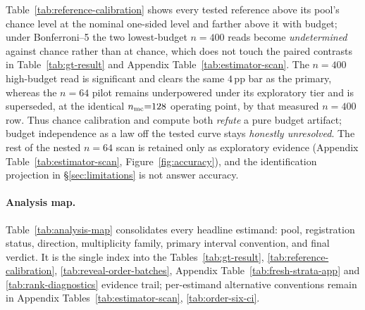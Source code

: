 \documentclass{article}
\newcommand{\pp}{\,\mathrm{pp}}
\begin{document}
Table~\ref{tab:reference-calibration} shows every tested reference above its
pool's chance level at the nominal one-sided level and farther above it with
budget; under Bonferroni--5 the two lowest-budget $n{=}400$ reads become
\emph{undetermined} against chance rather than at chance, which does not touch
the paired contrasts in Table~\ref{tab:gt-result} and Appendix
Table~\ref{tab:estimator-scan}.  The
$n=400$ high-budget read is significant and clears the same $4\pp$ bar as the
primary, whereas the $n=64$ pilot remains underpowered under its exploratory
tier and is superseded, at the identical $n_{\rm mc}{=}128$ operating point, by
that measured $n{=}400$ row.  Thus chance calibration and compute both
\emph{refute} a pure budget artifact; budget independence as a law off the
tested curve stays \emph{honestly unresolved}.  The rest of the nested $n=64$
scan is retained only as exploratory evidence (Appendix
Table~\ref{tab:estimator-scan}, Figure~\ref{fig:accuracy}), and the
identification projection in \S\ref{sec:limitations} is not answer accuracy.

\paragraph{Analysis map.}
Table~\ref{tab:analysis-map} consolidates every headline estimand: pool,
registration status, direction, multiplicity family, primary interval
convention, and final verdict.  It is the single index into the
Tables~\ref{tab:gt-result}, \ref{tab:reference-calibration},
\ref{tab:reveal-order-batches}, Appendix Table~\ref{tab:fresh-strata-app} and
\ref{tab:rank-diagnostics} evidence trail; per-estimand alternative
conventions remain in Appendix
Tables~\ref{tab:estimator-scan}, \ref{tab:order-six-ci}.
\end{document}
